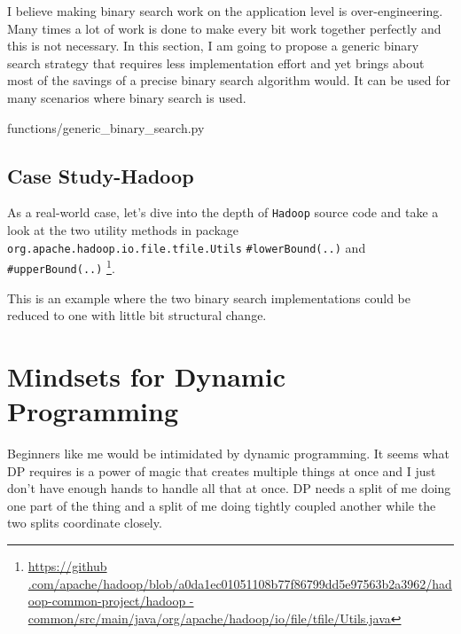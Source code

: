 \documentclass[oneside,11pt]{book}
\theoremstyle{definition}
\theoremstyle{remark}
\newcommand{\code}[1]{\mbox{\lstinline{#1}}}
\newcommand{\ilcode}[1]{\mbox{\texttt{#1}}}
\begin{document}
I believe making binary search work on the application level is over-engineering.
Many times a lot of work is done to make every bit work together perfectly and this is not
necessary.
In this section, I am going to propose a generic binary search strategy that requires less
implementation effort and yet brings about most of the savings of a precise binary search algorithm
would.
It can be used for many scenarios where binary search is used.
\begin{clisting}
    
    {functions/generic_binary_search.py}
\end{clisting}


\section{Case Study-Hadoop}
As a real-world case, let's dive into the depth of \code{Hadoop} source code and take a look at
the two utility methods in package \ilcode{org.apache.hadoop.io.file.tfile.Utils}
\ilcode{\#lowerBound(..)} and \ilcode{\#upperBound(..)} \footnote{\url{https://github
.com/apache/hadoop/blob/a0da1ec01051108b77f86799dd5e97563b2a3962/hadoop-common-project/hadoop
-common/src/main/java/org/apache/hadoop/io/file/tfile/Utils.java}}.

This is an example where the two binary search implementations could be reduced to one with
little bit structural change.
\clearpage{}
    \clearpage{}

\chapter{Mindsets for Dynamic Programming} \label{ch:dp}

Beginners like me would be intimidated by dynamic programming.
It seems what DP requires is a power of magic that creates multiple things at once and I just don't
have enough hands to handle all that at once.
DP needs a split of me doing one part of the thing and a split of me doing tightly coupled another
while the two splits coordinate closely.
\end{document}
